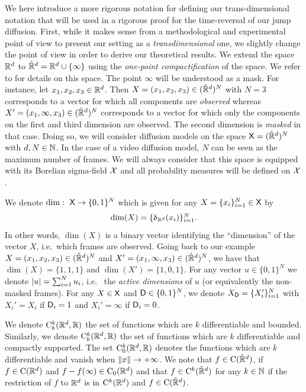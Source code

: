 We here introduce a more rigorous notation for defining our trans-dimensional notation that will be used in a rigorous proof for the time-reversal of our jump diffusion. First, while it makes sense from a methodological and experimental point of
view to present our setting as a \emph{transdimensional} one, we slightly change
the point of view in order to derive our theoretical results. We extend the
space $\mathbb{R}^d$ to $\hat{\mathbb{R}}^d = \mathbb{R}^d \cup \{\infty\}$ using the
\emph{one-point compactification} of the space. We refer to
\cite{kelley2017general} for details on this space. The point $\infty$ will be
understood as a mask. For instance, let $x_1, x_2, x_3 \in \mathbb{R}^d$. Then
$X = (x_1, x_2, x_3) \in (\hat{\mathbb{R}}^d)^N$ with $N=3$ corresponds to a vector
for which all components are \emph{observed} whereas
$X' = (x_1, \infty, x_3) \in (\hat{\mathbb{R}}^d)^N$ corresponds to a vector for
which only the components on the first and third dimension are observed. The
second dimension is \emph{masked} in that case. Doing so, we will consider
diffusion models on the space $\mathsf{X} = (\hat{\mathbb{R}}^d)^N$ with $d, N \in
\mathbb{N}$. In the case of a video diffusion model, $N$ can be seen as the maximum number of frames. We
will always consider that this space is equipped with its Borelian sigma-field
$\mathcal{X}$ and all probability measures will be defined on $\mathcal{X}$.

We denote $\mathrm{dim}: \ \mathsf{X} \to \{0,1\}^N$ which is given for any $X = \{x_i\}_{i=1}^N \in \mathsf{X}$ by
\begin{equation}
  \textstyle \mathrm{dim}(X) = \{\updelta_{\mathbb{R}^d}(x_i)\}_{i=1}^N . 
\end{equation}
In other words, $\dim(X)$ is a binary vector identifying the ``dimension'' of
the vector $X$, i.e.~which frames are observed. Going back to our example
$X = (x_1, x_2, x_3) \in (\hat{\mathbb{R}}^d)^N$ and
$X' = (x_1, \infty, x_3) \in (\hat{\mathbb{R}}^d)^N$, we have that
$\dim(X) = \{1,1,1\}$ and $\dim(X') = \{1, 0, 1\}$. For any vector
$u \in \{0,1\}^N$ we denote $|u| = \sum_{i=1}^N u_i$, i.e.~ the \emph{active
  dimensions} of $u$ (or equivalently the non-masked frames). For any
$X \in \mathsf{X}$ and $\mathsf{D} \in \{0, 1\}^N$, we denote $X_{\mathsf{D}} = \{X_i'\}_{i=1}^N$
with $X_i'=X_i$ if $\mathsf{D}_i=1$ and $X_i'=\infty$ if $\mathsf{D}_i=0$.

We denote $\mathrm{C}_b^k(\mathbb{R}^d, \mathbb{R})$ the set of functions which are $k$
differentiable and bounded. Similarly, we denote $\mathrm{C}_b^k(\mathbb{R}^d, \mathbb{R})$ the
set of functions which are $k$ differentiable and compactly supported. The set
$\mathrm{C}_0^k(\mathbb{R}^d, \mathbb{R})$ denotes the functions which are $k$ differentiable
and vanish when $\| x \| \to +\infty$.
We note that $f \in \mathrm{C}(\hat{\mathbb{R}}^d)$, if
$f \in \mathrm{C}(\mathbb{R}^d)$ and $f -f(\infty) \in \mathrm{C}_0(\mathbb{R}^d)$ and that
$f \in \mathrm{C}^k(\hat{\mathbb{R}}^d)$ for any $k \in \mathbb{N}$ if the restriction of $f$ to
$\mathbb{R}^d$ is in $\mathrm{C}^k(\mathbb{R}^d)$ and $f \in \mathrm{C}(\hat{\mathbb{R}}^d)$.

